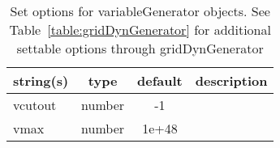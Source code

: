 \begin{table}[ht]
\centering
\begin{tabular}{p{5cm} c c p{7cm}}
\hline
string(s) & type & default & description \\
\hline
vcutout & number & -1 & \\
vmax & number & 1e+48 & \\
\hline
\end{tabular}
\caption{Set options for variableGenerator objects. See Table~\ref{table:gridDynGenerator} for additional settable options through gridDynGenerator}
\label{table:variableGenerator}
\end{table}
